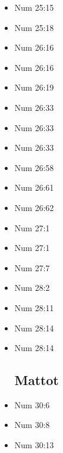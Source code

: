 \documentclass[14pt]{book}
\begin{document}
\begin{multicols}{2}
\begin{itemize}
\item Num 25:15

\item Num 25:18

\item Num 26:16

\item Num 26:16

\item Num 26:19

\item Num 26:33

\item Num 26:33

\item Num 26:33

\item Num 26:58

\item Num 26:61

\item Num 26:62

\item Num 27:1

\item Num 27:1

\item Num 27:7

\item Num 28:2

\item Num 28:11

\item Num 28:14

\item Num 28:14

\subsection{Mattot}

\item Num 30:6

\item Num 30:8

\item Num 30:13


\end{itemize}
\end{multicols}
\end{document}
